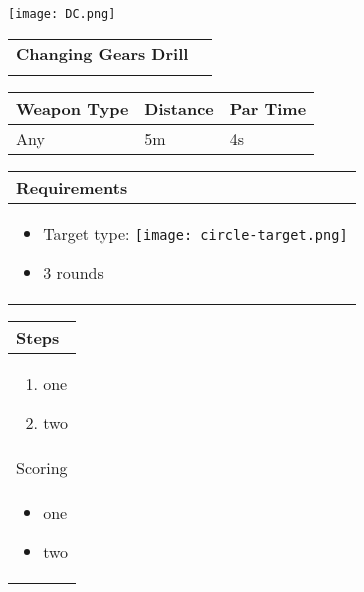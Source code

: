 \documentclass[../Cover.tex]{subfiles}
\begin{document}
	\begin{minipage}[t][0.15\textheight][t]{0.15\textwidth} 
		\texttt{[image: DC.png]}
	\end{minipage}
	\hfill
	\begin{minipage}[t][0.15\textheight][t]{0.8\textwidth}
		\begin{tabular}{ p{} l  }			
			\textbf{Changing Gears Drill} \\
			\\[0.09\textheight]
		\end{tabular}
		\quad
		\begin{tabular}{ | p{} | p{} | p{} |}
			\hline
			\tiny Weapon Type & \tiny Distance & \tiny Par Time\\ 
			\hline
			\tiny Any& \tiny 5m & \tiny 4s \\ %
			\hline
		\end{tabular}
	\end{minipage}
	\begin{tabular}{p{}}
		\small Requirements \\
		\hline
		\tiny \begin{itemize} %
			\item Target type: \texttt{[image: circle-target.png]}
			\item 3 rounds 
		\end{itemize}				
		\\[0.6\textheight]
	\end{tabular}
	\begin{tabular}{ | p{} |}
		\hline
		Steps\\ 
		\hline
		\tiny \begin{enumerate}[topsep=0pt, partopsep=0pt]
			\item one %
			\item two
		\end{enumerate}		
		\\ [2cm]
		\hline
		Scoring \\
		\hline
		\tiny \begin{itemize}[topsep=0pt, partopsep=0pt]
			\item one %
			\item two
		\end{itemize}		
		\\ [2cm]
		\hline
	\end{tabular}
\end{document}
